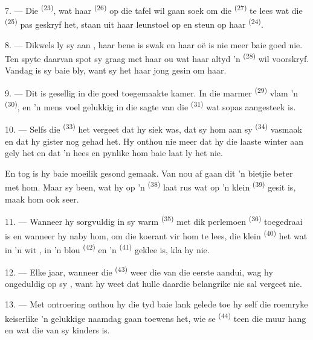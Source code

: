 7. --- Die  \textsuperscript{(23)}, wat haar 
\textsuperscript{(26)} op die tafel wil gaan soek om die 
\textsuperscript{(27)} te lees wat die  \textsuperscript{(25)} pas
geskryf het, staan uit haar leunstoel op en steun op haar 
\textsuperscript{(24)}.

8. --- Dikwels ly sy aan , haar
bene is swak en haar oë is nie meer baie goed nie. Ten spyte daarvan spot sy graag met
haar ou  wat haar altyd 'n  \textsuperscript{(28)} wil
voorskryf. Vandag is sy baie bly, want sy het haar jong gesin om haar.

9. --- Dit is gesellig in die goed toegemaakte kamer. In die marmer 
\textsuperscript{(29)} vlam 'n  \textsuperscript{(30)}, en 'n mens
voel gelukkig in die sagte  van die  \textsuperscript{(31)} wat
sopas aangesteek is.

\VUsaut{4.2mm}
\VUsaut{3.0mm}

10. --- Selfs die  \textsuperscript{(33)} het vergeet dat hy siek was, dat
sy  hom aan sy  \textsuperscript{(34)} vasmaak en dat
hy gister nog  gehad het. Hy onthou nie meer dat hy die laaste
winter aan  gely het en dat 'n hees en pynlike  hom
baie laat ly het nie.

En tog is hy baie moeilik gesond gemaak. Van nou af gaan dit 'n bietjie beter met hom.
Maar sy been, wat hy op 'n  \textsuperscript{(38)} laat rus wat op 'n
klein  \textsuperscript{(39)} gesit is, maak hom ook seer.

11. --- Wanneer hy sorgvuldig in sy warm  \textsuperscript{(35)} met
dik perlemoen \textsuperscript{(36)} toegedraai is en wanneer hy naby hom,
om die koerant vir hom te lees, die klein  \textsuperscript{(40)}
het wat in 'n wit , in 'n blou  \textsuperscript{(42)} en
'n  \textsuperscript{(41)} geklee is, kla hy nie.

12. --- Elke jaar, wanneer die  \textsuperscript{(43)} weer die
 van die eerste  aandui, wag hy ongeduldig op sy
, want hy weet dat hulle daardie belangrike  nie sal
vergeet nie.

13. --- Met ontroering onthou hy die tyd baie lank gelede toe hy self die roemryke
keiserlike  'n gelukkige naamdag gaan toewens het, wie se
 \textsuperscript{(44)} teen die muur hang en wat die
 van sy kinders is.
\VUsaut{6.0mm}
\VUfilet{22mm}
